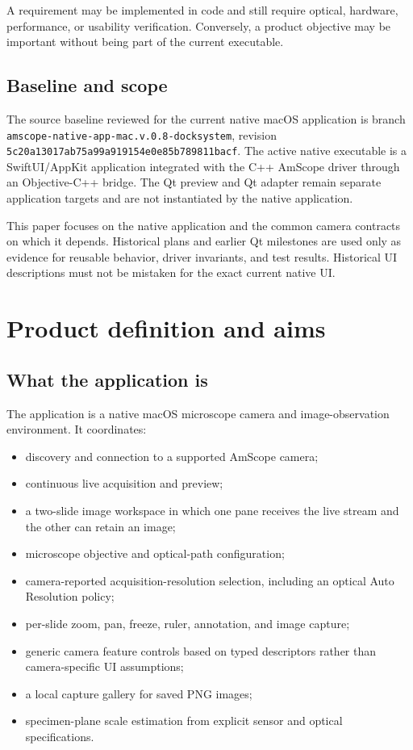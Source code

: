 \documentclass[11pt,a4paper,oneside]{article}
\newcommand{\code}[1]{\texttt{\small #1}}
\begin{document}
A requirement may be implemented in code and still require optical, hardware, performance, or usability verification. Conversely, a product objective may be important without being part of the current executable.

\subsection{Baseline and scope}
The source baseline reviewed for the current native macOS application is branch \code{amscope-native-app-mac.v.0.8-docksystem}, revision \code{5c20a13017ab75a99a919154e0e85b789811bacf}. The active native executable is a SwiftUI/AppKit application integrated with the C++ AmScope driver through an Objective-C++ bridge. The Qt preview and Qt adapter remain separate application targets and are not instantiated by the native application.

This paper focuses on the native application and the common camera contracts on which it depends. Historical plans and earlier Qt milestones are used only as evidence for reusable behavior, driver invariants, and test results. Historical UI descriptions must not be mistaken for the exact current native UI.

\section{Product definition and aims}

\subsection{What the application is}
The application is a native macOS microscope camera and image-observation environment. It coordinates:
\begin{itemize}
  \item discovery and connection to a supported AmScope camera;
  \item continuous live acquisition and preview;
  \item a two-slide image workspace in which one pane receives the live stream and the other can retain an image;
  \item microscope objective and optical-path configuration;
  \item camera-reported acquisition-resolution selection, including an optical Auto Resolution policy;
  \item per-slide zoom, pan, freeze, ruler, annotation, and image capture;
  \item generic camera feature controls based on typed descriptors rather than camera-specific UI assumptions;
  \item a local capture gallery for saved PNG images;
  \item specimen-plane scale estimation from explicit sensor and optical specifications.
\end{itemize}
\end{document}
